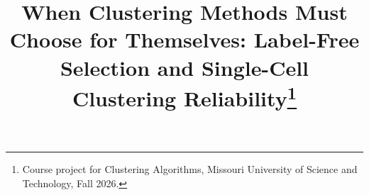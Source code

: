 \documentclass[conference]{IEEEtran}
\begin{document}
\title{When Clustering Methods Must Choose for Themselves: Label-Free Selection and Single-Cell Clustering Reliability\thanks{Course project for Clustering Algorithms, Missouri University of Science and Technology,
Fall 2026.}}

\author{
}

\maketitle













\appendices

\end{document}
